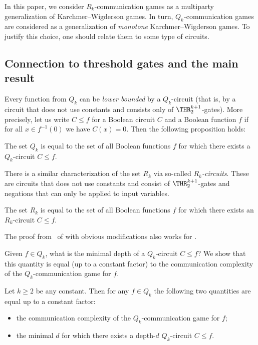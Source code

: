 In this paper, we consider $R_k$-communication games as a multiparty generalization of Karchmer--Wigderson games. In turn, $Q_k$-communication games are considered as a generalization of \emph{monotone} Karchmer--Wigderson games. To justify this choice, one should relate them to some type of circuits. 

\subsection{Connection to threshold gates and the main result}

Every function from $Q_k$ can be \emph{lower bounded} by a $Q_k$-circuit (that is, by a circuit that does not use constants and consists only of $\THR^{k + 1}_2$-gates). More precisely, let us write $C \le f$ for a Boolean circuit $C$ and a Boolean function $f$ if for all $x\in f^{-1}(0)$ we have $C(x) = 0$. Then the following proposition holds:
\begin{proposition}
\label{Q_k_char}
The set $Q_k$ is equal to the set of all Boolean functions $f$ for which there exists a $Q_k$-circuit $C\le f$.
\end{proposition}

There is a similar characterization of the set $R_k$ via so-called \emph{$R_k$-circuits}. These are circuits that does not use constants and consist of $\THR^{k + 1}_2$-gates and negations that can only be applied to input variables.
\begin{proposition}
\label{R_k_char}
The set $R_k$ is equal to the set of all Boolean functions $f$ for which there exists an $R_k$-circuit $C \le f$.
\end{proposition}
The proof from~\cite{Cohen2013} of  with obvious modifications also works for .

Given $f\in Q_k$, what is the minimal depth of a $Q_k$-circuit $C\le f$? We show that this quantity is equal (up to a constant factor) to the communication complexity of the $Q_k$-communication game for $f$.

\begin{theorem}
\label{Q_k_main}
Let $k \ge 2$ be any constant. Then for any $f\in Q_k$ the following two quantities are equal up to a constant factor:
\begin{itemize}
\item the communication complexity of the $Q_k$-communication game for $f$;
\item the minimal $d$ for which there exists a
%
depth-$d$   %
$Q_k$-circuit $C \le f$.
\end{itemize}
\end{theorem}


